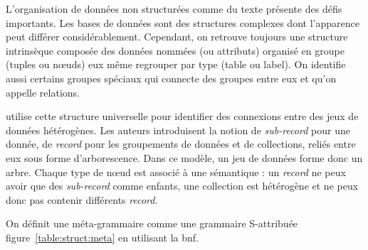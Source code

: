 L'organisation de données non structurées comme du texte présente des défis importants.
Les bases de données sont des structures complexes dont l'apparence peut différer considérablement.
Cependant, on retrouve toujours une structure intrinsèque composée des données nommées (ou attributs) organisé en groupe (tuples ou nœuds) eux même regrouper par type (table ou label).
On identifie aussi certains groupes spéciaux qui connecte des groupes entre eux et qu'on appelle relations.

\cite{barretGenericAbstractionsData2021a} utilise cette structure universelle pour identifier des connexions entre des jeux de données hétérogènes.
Les auteurs introduisent la notion de \emph{sub-record} pour une donnée, de \emph{record} pour les groupements de données et de collections, reliés entre eux sous forme d'arborescence.
Dans ce modèle, un jeu de données forme donc un arbre.
Chaque type de nœud est associé à une sémantique : un \emph{record} ne peux avoir que des \emph{sub-record} comme enfants, une collection est hétérogène et ne peux donc pas contenir différents \emph{record}.

On définit une méta-grammaire comme une grammaire S-attribuée figure~\ref{table:struct:meta} en utilisant la \gls{bnf}.

